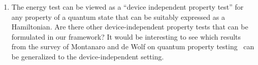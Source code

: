 \documentclass[11pt,letterpaper]{article}
\newcommand{\<}{\langle}
\renewcommand{\>}{\rangle}
\begin{document}
\begin{enumerate}
%

\item The energy test can be viewed as a ``device independent property
  test'' for any property of a quantum state that can be suitably
  expressed as a Hamiltonian. Are there other 
  device-independent property tests that can be formulated in our framework? It would be interesting to see
  which results from the survey of Montanaro and de
  Wolf on quantum property testing~\cite{montanaro2013survey} can be
  generalized to the device-independent setting.
\end{enumerate}




\end{document}
